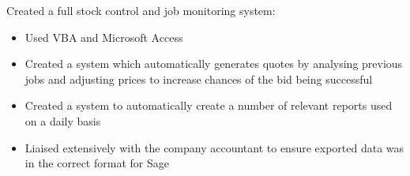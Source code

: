 \item Created a full stock control and job monitoring system:
\begin{itemize}%
    \item Used VBA and Microsoft Access
    \item Created a system which automatically generates quotes by analysing previous jobs and adjusting prices to increase chances of the bid being successful
    \item Created a system to automatically create a number of relevant reports used on a daily basis
    \item Liaised extensively with the company accountant to ensure exported data was in the correct format for Sage
\end{itemize}
\bigbreak
